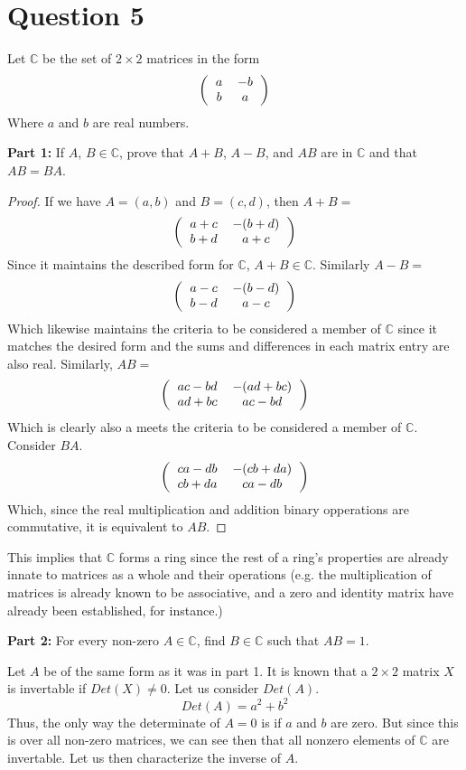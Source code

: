 \documentclass[12pt, letterpaper]{article}
\begin{document}
\section*{Question 5}
Let $\mathbb{C}$ be the set of $2 \times 2$ matrices in the form
\[
\left(
  \begin{tabular}{cc}
  $a$ & $-b$ \\
  $b$ & $a$
  \end{tabular}
\right)
\]
Where $a$ and $b$ are real numbers.

\noindent\textbf{Part 1:} If $A$, $B \in \mathbb{C}$, prove that $A + B$, $A - B$, and $AB$ are in $\mathbb{C}$ and that $AB = BA$.
\begin{proof}
\noindent If we have $A = (a, b)$ and $B = (c, d)$, then $A + B = $
\[
\left(
  \begin{tabular}{cc}
  $a + c$ & $-(b + d)$ \\
  $b + d$ & $a + c$
  \end{tabular}
\right)
\]
Since it maintains the described form for $\mathbb{C}$, $A + B \in \mathbb{C}$. Similarly $A - B =$
\[
\left(
  \begin{tabular}{cc}
  $a - c$ & $-(b - d)$ \\
  $b - d$ & $a - c$
  \end{tabular}
\right)
\]
Which likewise maintains the criteria to be considered a member of $\mathbb{C}$
since it matches the desired form and the sums and differences in each matrix entry are also real.
Similarly, $AB = $
\[
\left(
  \begin{tabular}{cc}
  $ac - bd$ & $-(ad + bc)$ \\
  $ad + bc$ & $ac - bd$
  \end{tabular}
\right)
\]
Which is clearly also a meets the criteria to be considered a member of $\mathbb{C}$. Consider $BA$.
\[
\left(
  \begin{tabular}{cc}
  $ca - db$ & $-(cb + da)$ \\
  $cb + da$ & $ca - db$
  \end{tabular}
\right)
\]
Which, since the real multiplication and addition binary opperations are commutative, it is equivalent to $AB$.
\end{proof}
This implies that $\mathbb{C}$ forms a ring since the rest of a ring's properties are already innate to matrices as a whole and their operations
 (e.g. the multiplication of matrices is already known to be associative, and a zero and identity matrix have already been established, for instance.)

 \noindent\textbf{Part 2:} For every non-zero $A \in \mathbb{C}$, find $B \in \mathbb{C}$ such that $AB = 1$.

 Let $A$ be of the same form as it was in part 1. It is known that a $2 \times 2$ matrix $X$ is invertable if $Det(X) \neq 0$. Let us consider $Det(A)$.
 $$ Det(A) = a^2 + b^2 $$
 Thus, the only way the determinate of $A = 0$ is if $a$ and $b$ are zero.
 But since this is over all non-zero matrices, we can see then that all nonzero elements of $\mathbb{C}$ are invertable. Let us then characterize the inverse of $A$.
\end{document}
